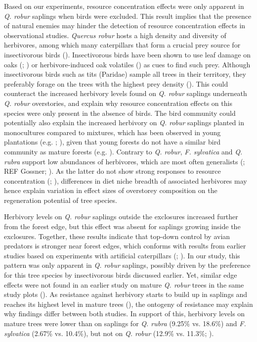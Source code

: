 \documentclass[b5paper,10pt]{book} %
\begin{document}
	\medskip

	Based on our experiments, resource concentration effects were only apparent in \textit{Q. robur} saplings when birds were excluded. This result implies that the presence of natural enemies may hinder the detection of resource concentration effects in observational studies. \textit{Quercus robur} hosts a high density and diversity of herbivores, among which many caterpillars that form a crucial prey source for insectivorous birds (\citealt{Naef-Daenzer2000}). Insectivorous birds have been shown to use leaf damage on oaks (\citealt{Heinrich1983}; \citealt{Gunnarsson2018}) or herbivore-induced oak volatiles  (\citealt{Amo2013}) as cues to find such prey. Although insectivorous birds such as tits (Paridae) sample all trees in their territory, they preferably forage on the trees with the highest prey density (\citealt{Naef-Daenzer2000}). This could counteract the increased herbivory levels found on \textit{Q. robur} saplings underneath \textit{Q. robur} overstories, and explain why resource concentration effects on this species were only present in the absence of birds. The bird community could potentially also explain the increased herbivory on \textit{Q. robur} saplings planted in monocultures compared to mixtures, which has been observed in young plantations (e.g. \citealt{Alalouni2014}; \citealt{Setiawan2014}), given that young forests do not have a similar bird community as mature forests (e.g. \citealt{Whytock2018}). Contrary to \textit{Q. robur}, \textit{F. sylvatica} and \textit{Q. rubra} support low abundances of herbivores, which are most often generalists (\citealt{Brandle2001}; REF Gossner; \citealt{Branco2015}). As the latter do not show strong responses to resource concentration (\citealt{Jactel2005}; \citealt{Castagneyrol2014}), differences in diet niche breadth of associated herbivores may hence explain variation in effect sizes of overstorey composition on the regeneration potential of tree species. 

	Herbivory levels on \textit{Q. robur} saplings outside the exclosures increased further from the forest edge, but this effect was absent  for saplings growing inside the exclosures. Together, these results indicate that top-down control by avian predators is stronger near forest edges, which conforms with results from earlier studies based on experiments with artificial caterpillars (\citealt{Barbaro2014}; \citealt{Gonzalez-Gomez2017}). In our study, this pattern was only apparent in \textit{Q. robur} saplings, possibly driven by the preference for this tree species by insectivorous birds discussed earlier. Yet, similar edge effects were not found in an earlier study on mature \textit{Q. robur} trees in the same study plots (\citealt{vanSchrojensteinLantman2018}). As resistance against herbivory starts to build up in saplings and reaches its highest level in mature trees (\citealt{Boege2005}), the ontogeny of resistance may explain why findings differ between both studies. In support of this, herbivory levels on mature trees were lower than on saplings for \textit{Q. rubra} (9.25\% vs. 18.6\%) and \textit{F. sylvatica} (2.67\% vs. 10.4\%), but not on \textit{Q. robur} (12.9\% vs. 11.3\%; \citealt{vanSchrojensteinLantman2018}).
\end{document}
